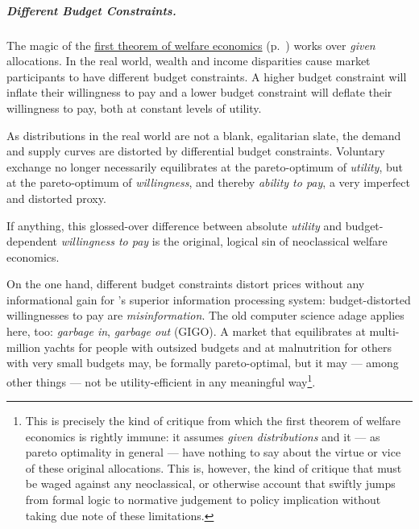

\subparagraph{Different Budget Constraints.}  \label{sec:different-budget-constraints} The magic of the \hyperref[fn:1st-theorem]{first theorem of welfare economics} (p.~\pageref{fn:1st-theorem}) works over \emph{given} allocations. In the real world, wealth and income disparities cause market participants to have different budget constraints. A higher budget constraint will inflate their willingness to pay and a lower budget constraint will deflate their willingness to pay, both at constant levels of utility. 

As distributions in the real world are not a blank, egalitarian slate, the demand and supply curves are distorted by differential budget constraints. Voluntary exchange no longer necessarily equilibrates at the pareto-optimum of \emph{utility}, but at the pareto-optimum of \emph{willingness}, and thereby \emph{ability to pay}, a very imperfect and distorted proxy. 

If anything, this glossed-over difference between absolute \emph{utility} and budget-dependent \emph{willingness to pay} is the original, logical sin of neoclassical welfare economics. 

On the one hand, different budget constraints distort prices without any informational gain for \citeauthor{Hayek1931}'s superior information processing system: budget-distorted willingnesses to pay are \emph{misinformation}. The old computer science adage applies here, too: \emph{garbage in}, \emph{garbage out} (GIGO). A market that equilibrates at multi-million yachts for people with outsized budgets and at malnutrition for others with very small budgets may, be formally pareto-optimal, but it may --- among other things --- not be utility-efficient in any meaningful way\footnote{
	This is precisely the kind of critique from which the first theorem of welfare economics is rightly immune: it assumes \emph{given distributions} and it --- as pareto optimality in general --- have nothing to say about the virtue or vice of these original allocations. This is, however, the kind of critique that must be waged against any neoclassical, or otherwise account that swiftly jumps from formal logic to normative judgement to policy implication without taking due note of these limitations.}.


